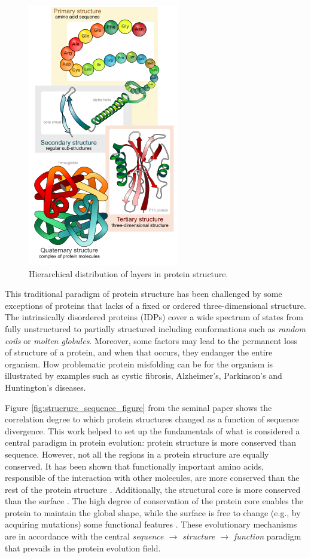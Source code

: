 \documentclass[12pt, b5paper,twoside]{tesi_upf}
\begin{document}
\begin{figure}[htbp]

  \centering
  	\includegraphics[scale=0.5]{../figures/protein_structure_levels_en.png} %

	\caption{Hierarchical distribution of layers in protein structure.}
	\label{fig:hierarchy_figure}
\end{figure}
\par This traditional paradigm of protein structure has been challenged by some exceptions of proteins that lacks of a fixed or ordered three-dimensional structure. The intrinsically disordered proteins (IDPs) cover a wide spectrum of states from fully unstructured to partially structured including conformations such as \textit{random coils} or \textit{molten globules}. Moreover, some  factors may lead to the permanent loss of structure of a protein, and when that occurs, they endanger the entire organism. How problematic protein misfolding can be for the organism is illustrated by examples such as cystic fibrosis, Alzheimer's, Parkinson's and Huntington's diseases.
\par Figure \ref{fig:strucrure_sequence_figure} from the seminal paper \cite{StructureSequence} shows the correlation degree to which protein structures changed as a function of sequence divergence. This work helped to set up the fundamentals of what is considered a central paradigm in protein evolution: protein structure is more conserved than sequence. However, not all the regions in a protein structure are equally conserved. It has been shown that functionally important amino acids, responsible of the interaction with other molecules, are more conserved than the rest of the protein structure \cite{conservPPI}. Additionally, the structural core is more conserved than the surface \cite{Raj2007}. The high degree of conservation of the protein core enables the protein to maintain the global shape, while the surface is free to change (e.g., by acquiring mutations) some functional features \cite{Todd2001}. These evolutionary mechanisms are in accordance with the central \textit{sequence $\rightarrow$ structure $\rightarrow$ function} paradigm that prevails in the protein evolution field. 
\end{document}
